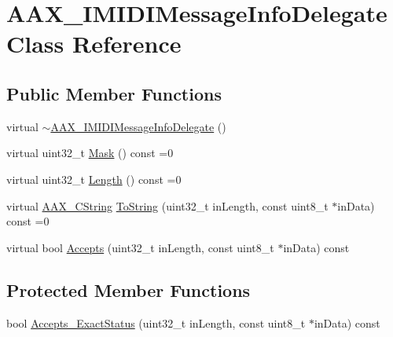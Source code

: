 \hypertarget{a01953}{}\section{A\+A\+X\+\_\+\+I\+M\+I\+D\+I\+Message\+Info\+Delegate Class Reference}
\label{a01953}
\subsection*{Public Member Functions}
\begin{DoxyCompactItemize}
\item 
virtual \mbox{\hyperlink{a01953_a33acb96476b625d0efcc066d86087464}{$\sim$\+A\+A\+X\+\_\+\+I\+M\+I\+D\+I\+Message\+Info\+Delegate}} ()
\item 
virtual uint32\+\_\+t \mbox{\hyperlink{a01953_ad04902fa8b4e437f200a314721eeaea4}{Mask}} () const =0
\item 
virtual uint32\+\_\+t \mbox{\hyperlink{a01953_a7e4bb6faf47d70dbefcdde952dd76e1c}{Length}} () const =0
\item 
virtual \mbox{\hyperlink{a01573}{A\+A\+X\+\_\+\+C\+String}} \mbox{\hyperlink{a01953_ace3e3e5900288bd6de7dd2612a57afc2}{To\+String}} (uint32\+\_\+t in\+Length, const uint8\+\_\+t $\ast$in\+Data) const =0
\item 
virtual bool \mbox{\hyperlink{a01953_a293e390875d91b5dc0ff51e847aa886c}{Accepts}} (uint32\+\_\+t in\+Length, const uint8\+\_\+t $\ast$in\+Data) const
\end{DoxyCompactItemize}
\subsection*{Protected Member Functions}
\begin{DoxyCompactItemize}
\item 
bool \mbox{\hyperlink{a01953_a309f83a83541ce2b1f429ae2d009616c}{Accepts\+\_\+\+Exact\+Status}} (uint32\+\_\+t in\+Length, const uint8\+\_\+t $\ast$in\+Data) const
\end{DoxyCompactItemize}
